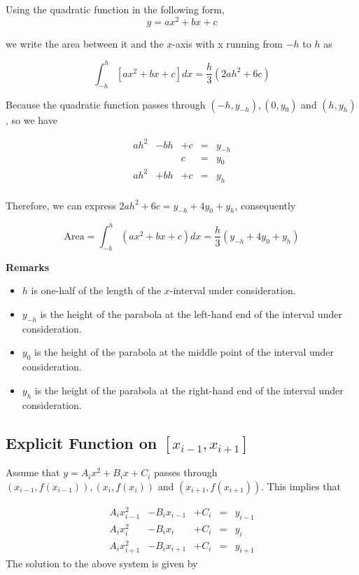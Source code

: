 \documentclass[
]{book}
\begin{document}
Using the quadratic function in the following form,
\[
y = ax^2 + bx + c
\]

we write the area between it and the \(x\)-axis with x running from \(-h\) to \(h\) as

\[
\int_{-h}^h [ax^2 + bx + c]dx = \frac{h}{3}(2ah^2 + 6c)
\]

Because the quadratic function passes through \((-h, y_{-h}), (0, y_0)\) and \((h, y_h)\), so we have

\[
\begin{array}{ccccc}
 ah^2 & - bh  &  +c & =  & y_{-h}  \\ 
   &   &   c & =  & y_0  \\ 
ah^2 & + bh  &  +c & =  & y_{h}  \\ 
\end{array}
\]

Therefore, we can express \(2ah^2 + 6c = y_{-h} +4y_0 + y_h\), consequently

\[
\text{Area} = \int_{-h}^h(ax^2 + bx + c)dx = \frac{h}{3}( y_{-h} +4y_0 + y_h)
\]

\textbf{Remarks}

\begin{itemize}
\item
  \(h\) is one-half of the length of the \(x\)-interval under consideration.
\item
  \(y_{-h}\) is the height of the parabola at the left-hand end of the interval under consideration.
\item
  \(y_0\) is the height of the parabola at the middle point of the interval under consideration.
\item
  \(y_h\) is the height of the parabola at the right-hand end of the interval under consideration.
\end{itemize}

\hypertarget{explicit-function-on-x_i-1-x_i1}{%
\subsection{\texorpdfstring{Explicit Function on \([x_{i-1}, x_{i+1}]\)}{Explicit Function on {[}x\_\{i-1\}, x\_\{i+1\}{]}}}\label{explicit-function-on-x_i-1-x_i1}}

Assume that \(y = A_ix^2 + B_ix + C_i\) passes through \((x_{i-1}, f(x_{i-1})), (x_i, f(x_i))\) and \((x_{i+1}, f(x_{i+1}))\). This implies that

\[
\begin{array}{ccccc}
 A_ix^2_{i-1} & - B_i x_{i-1}  &  + C_i & =  & y_{i-1}  \\ 
 A_ix^2_{i} & - B_i x_{i}  &  + C_i & =  & y_{i}   \\ 
 A_ix^2_{i+1} & - B_i x_{i+1}  &  + C_i & =  & y_{i+1}  
\end{array}
\]
The solution to the above system is given by
\end{document}
